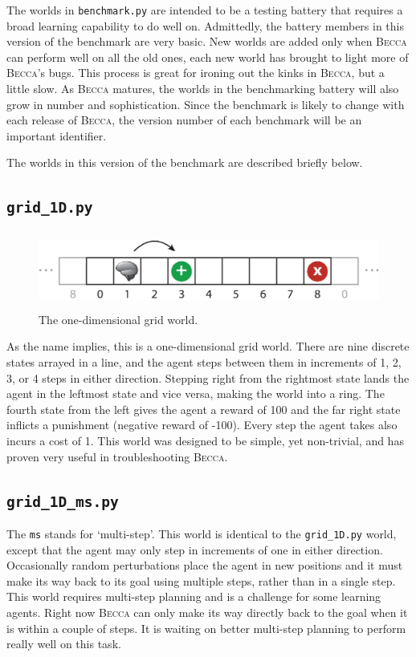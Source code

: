 The worlds in \texttt{benchmark.py} are intended to be a testing battery that requires a broad learning capability to do well on. Admittedly, the battery members in this version of the benchmark are very basic. New worlds are added only when \textsc{Becca} can perform well on all the old ones, each new world has brought to light more of \textsc{Becca}'s bugs. This process is great for ironing out the kinks in \textsc{Becca}, but a little slow. As \textsc{Becca} matures, the worlds in the benchmarking battery will also grow in number and sophistication. Since the benchmark is likely to change with each release of \textsc{Becca}, the version number of each benchmark will be an important identifier.

The worlds in this version of the benchmark are described briefly below.

\subsection{\texttt{grid\_1D.py}}

\begin{figure}
\centering
\includegraphics[height=2.5cm]{figs/grid_world_1D.eps}
\caption{The one-dimensional grid world.}
\label{grid_1D}
\end{figure}

As the name implies, this is a one-dimensional grid world. There are nine discrete states arrayed in a line, and the agent steps between them in increments of 1, 2, 3, or 4 steps in either direction. Stepping right from the rightmost state lands the agent in the leftmost state and vice versa, making the world into a ring. The fourth state from the left gives the agent a reward of 100 and the far right state inflicts a punishment (negative reward of -100). Every step the agent takes also incurs a cost of  1. This world was designed to be simple, yet non-trivial, and has proven very useful in troubleshooting \textsc{Becca}.

\subsection{\texttt{grid\_1D\_ms.py}}

The \texttt{ms} stands for `multi-step'. This world is identical to the \texttt{grid\_1D.py} world, except that the agent may only step in increments of one in either direction. Occasionally random perturbations place the agent in new positions and it must make its way back to its goal using multiple steps, rather than in a single step. This world requires multi-step planning and is a challenge for some learning agents. Right now \textsc{Becca} can only make its way directly back to the goal when it is within a couple of steps. It is waiting on better multi-step planning to perform really well on this task.

